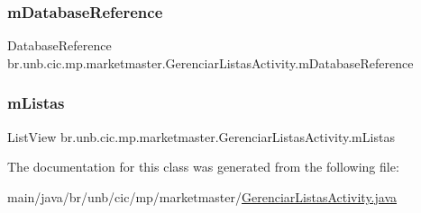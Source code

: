 \subsubsection{\texorpdfstring{m\+Database\+Reference}{mDatabaseReference}}
{\footnotesize\ttfamily Database\+Reference br.\+unb.\+cic.\+mp.\+marketmaster.\+Gerenciar\+Listas\+Activity.\+m\+Database\+Reference\hspace{0.3cm}{\ttfamily [private]}}

\mbox{\label{classbr_1_1unb_1_1cic_1_1mp_1_1marketmaster_1_1GerenciarListasActivity_a0fdef308d798ed86885db16fc7ff9bc5}} 
\subsubsection{\texorpdfstring{m\+Listas}{mListas}}
{\footnotesize\ttfamily List\+View br.\+unb.\+cic.\+mp.\+marketmaster.\+Gerenciar\+Listas\+Activity.\+m\+Listas\hspace{0.3cm}{\ttfamily [private]}}



The documentation for this class was generated from the following file\+:\begin{DoxyCompactItemize}
\item 
main/java/br/unb/cic/mp/marketmaster/\mbox{\hyperlink{GerenciarListasActivity_8java}{Gerenciar\+Listas\+Activity.\+java}}\end{DoxyCompactItemize}
